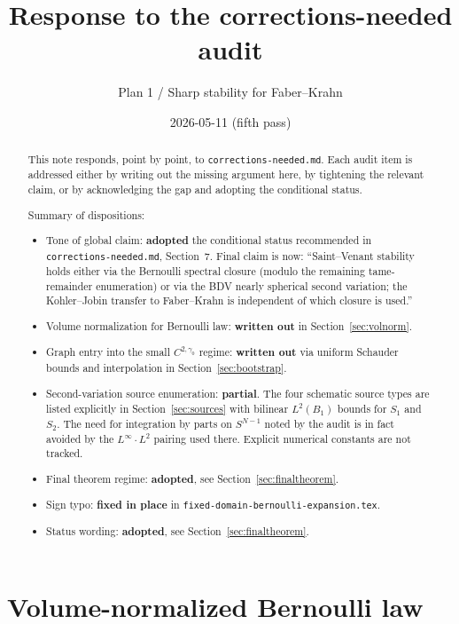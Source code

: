 \documentclass[11pt]{article}
\title{Response to the corrections-needed audit}
\author{Plan 1 / Sharp stability for Faber--Krahn}
\date{2026-05-11 (fifth pass)}
\theoremstyle{definition}
\begin{document}
\maketitle

\begin{abstract}
This note responds, point by point, to \texttt{corrections-needed.md}. Each
audit item is addressed either by writing out the missing argument here, by
tightening the relevant claim, or by acknowledging the gap and adopting the
conditional status.

Summary of dispositions:

\begin{itemize}
\item[(1)] Tone of global claim: \textbf{adopted} the conditional status
recommended in \texttt{corrections-needed.md}, Section~7. Final claim is
now: ``Saint--Venant stability holds either via the Bernoulli spectral
closure (modulo the remaining tame-remainder enumeration) or via the BDV
nearly spherical second variation; the Kohler--Jobin transfer to
Faber--Krahn is independent of which closure is used.''
\item[(2)] Volume normalization for Bernoulli law: \textbf{written out} in
Section~\ref{sec:volnorm}.
\item[(3)] Graph entry into the small $C^{2,\gamma_0}$ regime:
\textbf{written out} via uniform Schauder bounds and interpolation in
Section~\ref{sec:bootstrap}.
\item[(4)] Second-variation source enumeration: \textbf{partial}. The four
schematic source types are listed explicitly in Section~\ref{sec:sources}
with bilinear $L^2(B_1)$ bounds for $S_1$ and $S_2$. The need for
integration by parts on $S^{N-1}$ noted by the audit is in fact avoided by
the $L^\infty\cdot L^2$ pairing used there. Explicit numerical
constants are not tracked.
\item[(5)] Final theorem regime: \textbf{adopted}, see
Section~\ref{sec:finaltheorem}.
\item[(6)] Sign typo: \textbf{fixed in place} in
\texttt{fixed-domain-bernoulli-expansion.tex}.
\item[(7)] Status wording: \textbf{adopted}, see
Section~\ref{sec:finaltheorem}.
\end{itemize}
\end{abstract}

\section{Volume-normalized Bernoulli law}\label{sec:volnorm}
\end{document}
